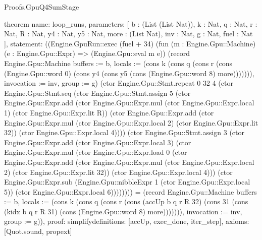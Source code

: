 \begin{lexlean}{Proofs.GpuQ4SumStage}
\begin{semanticmodule}
theorem{
  name: loop_runs,
  parameters: [
    b : (List (List Nat)),
    k : Nat,
    q : Nat,
    r : Nat,
    R : Nat,
    y4 : Nat,
    y5 : Nat,
    more : (List Nat),
    inv : Nat,
    g : Nat,
    fuel : Nat
  ],
  statement: ((Engine.GpuRun::exec (fuel + 34) (fun (m : Engine.Gpu::Machine) (e : Engine.Gpu::Expr) => (Engine.Gpu::eval m e)) (record Engine.Gpu::Machine {buffers := b, locals := (cons k (cons q (cons r (cons (Engine.Gpu::word 0) (cons y4 (cons y5 (cons (Engine.Gpu::word 8) more))))))), invocation := inv, group := g}) (ctor Engine.Gpu::Stmt.repeat 0 32 4 (ctor Engine.Gpu::Stmt.seq (ctor Engine.Gpu::Stmt.assign 5 (ctor Engine.Gpu::Expr.add (ctor Engine.Gpu::Expr.mul (ctor Engine.Gpu::Expr.local 1) (ctor Engine.Gpu::Expr.lit R)) (ctor Engine.Gpu::Expr.add (ctor Engine.Gpu::Expr.mul (ctor Engine.Gpu::Expr.local 2) (ctor Engine.Gpu::Expr.lit 32)) (ctor Engine.Gpu::Expr.local 4)))) (ctor Engine.Gpu::Stmt.assign 3 (ctor Engine.Gpu::Expr.add (ctor Engine.Gpu::Expr.local 3) (ctor Engine.Gpu::Expr.mul (ctor Engine.Gpu::Expr.load 0 (ctor Engine.Gpu::Expr.add (ctor Engine.Gpu::Expr.mul (ctor Engine.Gpu::Expr.local 2) (ctor Engine.Gpu::Expr.lit 32)) (ctor Engine.Gpu::Expr.local 4))) (ctor Engine.Gpu::Expr.sub (Engine.Gpu::nibbleExpr 1 (ctor Engine.Gpu::Expr.local 5)) (ctor Engine.Gpu::Expr.local 6)))))))) = (record Engine.Gpu::Machine {buffers := b, locals := (cons k (cons q (cons r (cons (accUp b q r R 32) (cons 31 (cons (kidx b q r R 31) (cons (Engine.Gpu::word 8) more))))))), invocation := inv, group := g})),
  proof: simplify{definitions: [accUp, exec_done, iter_step]},
  axioms: [Quot.sound, propext]
}


\end{semanticmodule}
\end{lexlean}
